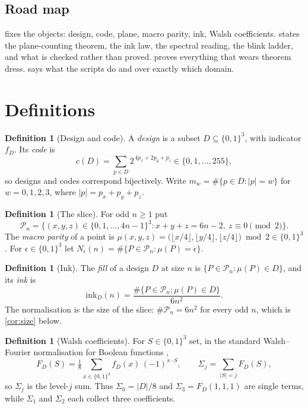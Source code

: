 \documentclass[11pt]{amsart}
\theoremstyle{definition}
\newtheorem{definition}[theorem]{Definition}
\theoremstyle{remark}
\begin{document}
\subsection*{Road map}

 fixes the objects: design, code, plane, macro parity, ink, Walsh coefficients.  states the plane-counting theorem, the ink law, the spectral reading, the blink ladder, and what is checked rather than proved.  proves everything that wears theorem dress.  says what the scripts do and over exactly which domain.

\section{Definitions}
\label{sec:def}

\begin{definition}[Design and code]
\label{def:design}
A \emph{design} is a subset $D \subseteq \{0,1\}^3$, with indicator $f_D$. Its \emph{code} is
\[
c(D) = \sum_{p \in D} 2^{\,4p_x + 2p_y + p_z} \in \{0,1,\dots,255\},
\]
so designs and codes correspond bijectively. Write $m_w = \#\{p \in D : |p| = w\}$ for $w = 0,1,2,3$, where $|p| = p_x+p_y+p_z$.
\end{definition}

\begin{definition}[The slice]
\label{def:slice}
For odd $n \ge 1$ put
\[
\mathcal{P}_n = \bigl\{(x,y,z) \in \{0,1,\dots,4n-1\}^3 : x+y+z = 6n-2,\ z \equiv 0 \!\!\pmod 2 \bigr\}.
\]
The \emph{macro parity} of a point is
$\mu(x,y,z) = \bigl(\lfloor x/4 \rfloor, \lfloor y/4 \rfloor, \lfloor z/4 \rfloor\bigr) \bmod 2 \in \{0,1\}^3$.
For $\epsilon \in \{0,1\}^3$ let $N_\epsilon(n) = \#\{P \in \mathcal{P}_n : \mu(P) = \epsilon\}$.
\end{definition}

\begin{definition}[Ink]
\label{def:ink}
The \emph{fill} of a design $D$ at size $n$ is $\{P \in \mathcal{P}_n : \mu(P) \in D\}$, and its \emph{ink} is
\[
\mathrm{ink}_D(n) = \frac{\#\{P \in \mathcal{P}_n : \mu(P) \in D\}}{6n^2}.
\]
The normalisation is the size of the slice: $\#\mathcal{P}_n = 6n^2$ for every odd $n$, which is \cref{cor:size} below.
\end{definition}

\begin{definition}[Walsh coefficients]
\label{def:walsh}
For $S \in \{0,1\}^3$ set, in the standard Walsh--Fourier normalisation for Boolean functions \cite[Ch.~1]{odonnell},
\[
F_D(S) = \tfrac18 \sum_{x \in \{0,1\}^3} f_D(x)\,(-1)^{x \cdot S},
\qquad
\Sigma_j = \sum_{|S| = j} F_D(S),
\]
so $\Sigma_j$ is the level-$j$ sum. Thus $\Sigma_0 = |D|/8$ and $\Sigma_3 = F_D(1,1,1)$ are single terms, while $\Sigma_1$ and $\Sigma_2$ each collect three coefficients.
\end{definition}
\end{document}
